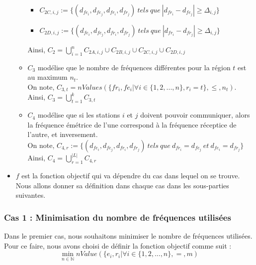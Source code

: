 \documentclass[a4paper, 10pt]{article}
\begin{document}
\begin{itemize}
\begin{itemize}
\begin{itemize}
                        \item $C_{2C,i,j} := \{(d_{fe_i},d_{fe_j},d_{fr_i},d_{fr_j}) ~tels~que~| d_{fr_i} - d_{fe_j} | \geq \Delta_{i,j} \}$
                        \item $C_{2D,i,j} := \{(d_{fe_i},d_{fe_j},d_{fr_i},d_{fr_j}) ~tels~que~ | d_{fr_i} - d_{fr_j} | \geq \Delta_{i,j} \}$
                      \end{itemize}
                      Ainsi, $\displaystyle{C_2 = \bigcup_{i=1}^{n} C_{2A,i,j} \cup C_{2B,i,j} \cup C_{2C,i,j}  \cup C_{2D,i,j}}$
                \item $C_3$ modélise que le nombre de fréquences différentes pour la région $t$ est au maximum $n_t$. \\
                      On note, $C_{3,t} = nValues(\{fr_{i}, fe_{i} | \forall i \in \{1,2,...,n \}, r_{i} = t \}, \leq, n_{t})$. \\
                      Ainsi, $\displaystyle{C_3 = \bigcup_{t=1}^{k} C_{3,t}}$
                \item $C_4$ modélise que si les stations $i$ et $j$ doivent pouvoir communiquer, alors la fréquence émétrice de l'une correspond à la fréquence réceptice de l'autre, et inversement. \\
                On note, $\displaystyle{ C_{4,r} := \{ (d_{fe_i},d_{fe_j},d_{fr_i},d_{fr_j})~tels~que~d_{fr_i} = d_{fe_j}~et~d_{fe_i} = d_{fr_j} \} }$ \\
                Ainsi, $\displaystyle{C_4 = \bigcup_{r=1}^{|L|} C_{4,r}}$

              \end{itemize}

          \item $f$ est la fonction objectif qui va dépendre du cas dans lequel on se trouve. Nous allons donner sa définition dans chaque cas dans les sous-parties suivantes.
      \end{itemize}



      \subsubsection{Cas 1 : Minimisation du nombre de fréquences utilisées}

        Dans le premier cas, nous souhaitons minimiser le nombre de fréquences utilisées. Pour ce faire, nous avons choisi de définir la fonction objectif comme suit :
        $$ \displaystyle{ \min_{n \in \mathbb{N}}  nValue(\{ e_{i}, r_{i} | \forall i \in \{1,2,...,n \}, =, m) }$$
\end{document}
